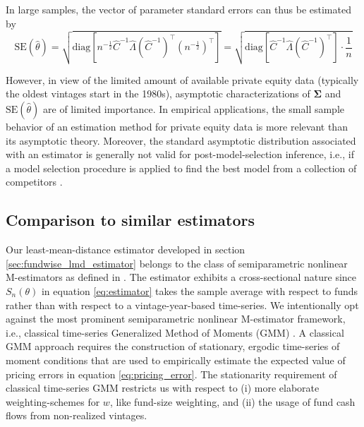 \documentclass[12pt]{article}
\begin{document}
In large samples, the vector of parameter standard errors can thus be estimated by
\[
\mathrm{SE}(\hat{\theta}) = 
\sqrt{
	\mathrm{diag} \left[
	n^{-\frac{1}{2}}
	\hat{C}^{-1} \hat{\Lambda} (\hat{C}^{-1})^\top
	(n^{-\frac{1}{2}})^\top
	\right] 
}
=
\sqrt{
	\mathrm{diag} \left[
	\hat{C}^{-1} \hat{\Lambda} (\hat{C}^{-1})^\top
	\right] 
	\cdot \frac{1}{n}
}
\]
\iffalse
The Wald test statistic for linear hypotheses $H_0: R \theta = r$ and $H_1: R \theta \neq r$ is constructed as
\[
W = 
(R \hat{\theta} - r)^\top
\left[
R
\frac{\hat{C}^{-1} \hat{\Delta} (\hat{C}^{-1})^\top}{n}
R^\top
\right]^{-1}
(R \hat{\theta} - r)
\stackrel{H_0}{\sim}
\chi_q^2
\]
where $\hat{\theta}$ is the $p \times 1$ parameter vector, $R$ is a $q \times p$ matrix, and $r$ is a $q \times 1$ vector.
Usually, we select $R$ as $p \times p$ identity matrix, and $r$ as $p \times 1$ vector (e.g., of zeros).
Under the null hypothesis, $W$ is chi-squared distributed with $q$ degrees of freedom. As large values of $W$ indicate the rejection of $H_0$, the corresponding p-value is calculated as $1 - F_{\chi_q^2}(W)$ where $F_{\chi_q^2}$ is the cumulative distribution function of a chi-squared random variable with $q$ degrees of freedom.
\fi
However, in view of the limited amount of available private equity data (typically the oldest vintages start in the 1980s), asymptotic characterizations of $\mathbf{\Sigma}$ and $\mathrm{SE}(\hat{\theta})$ are of limited importance. 
In empirical applications, the small sample behavior of an estimation method for private equity data is more relevant than its asymptotic theory.
Moreover, the standard asymptotic distribution associated with an estimator is generally not valid for post-model-selection inference, i.e., if a model selection procedure is applied to find the best model from a collection of competitors \citep{LP05}.


\subsection{Comparison to similar estimators}

Our least-mean-distance estimator developed in section \ref{sec:fundwise_lmd_estimator} belongs to the class of semiparametric nonlinear M-estimators as defined in \cite{PP97}.
The estimator exhibits a cross-sectional nature since $S_n(\theta)$ in equation \ref{eq:estimator} takes the sample average with respect to funds rather than with respect to a vintage-year-based time-series.
We intentionally opt against the most prominent semiparametric nonlinear M-estimator framework, i.e., classical time-series Generalized Method of Moments (GMM) \citep{H82,H12}.
A classical GMM approach requires the construction of stationary, ergodic time-series of moment conditions that are used to empirically estimate the expected value of pricing errors in equation \ref{eq:pricing_error}.
The stationarity requirement of classical time-series GMM restricts us with respect to (i) more elaborate weighting-schemes for $w$, like fund-size weighting, and (ii) the usage of fund cash flows from non-realized vintages.
\end{document}
